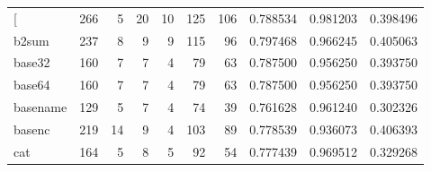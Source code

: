 \begin{longtable}{lrrrrrrrrr}
\bottomrule
\endlastfoot
{[}         &                    266 &                                  5 &                                20 &                               10 &                               125 &                             106 &                                0.788534 &                               0.981203 &                             0.398496 \\
b2sum     &                    237 &                                  8 &                                 9 &                                9 &                               115 &                              96 &                                0.797468 &                               0.966245 &                             0.405063 \\
base32    &                    160 &                                  7 &                                 7 &                                4 &                                79 &                              63 &                                0.787500 &                               0.956250 &                             0.393750 \\
base64    &                    160 &                                  7 &                                 7 &                                4 &                                79 &                              63 &                                0.787500 &                               0.956250 &                             0.393750 \\
basename  &                    129 &                                  5 &                                 7 &                                4 &                                74 &                              39 &                                0.761628 &                               0.961240 &                             0.302326 \\
basenc    &                    219 &                                 14 &                                 9 &                                4 &                               103 &                              89 &                                0.778539 &                               0.936073 &                             0.406393 \\
cat       &                    164 &                                  5 &                                 8 &                                5 &                                92 &                              54 &                                0.777439 &                               0.969512 &                             0.329268 \\

\end{longtable}
